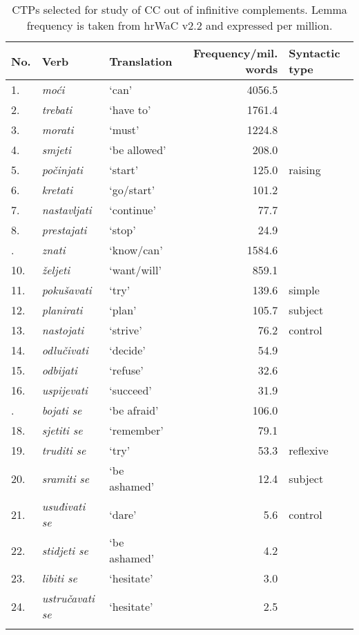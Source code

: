 \begin{table}[t]
\caption{CTPs selected for study of CC out of infinitive complements. Lemma frequency is taken from hrWaC v2.2 and expressed per million.\label{T12.3}}
\begin{tabular}{lllrl}
\lsptoprule
No. & Verb & Translation & Frequency/mil. words & Syntactic type\\\midrule
1.&\textit{moći} &‘can’&4056.5&\\
2.&\textit{trebati}&‘have to’&1761.4&\\
3. &\textit{morati}&‘must’ &1224.8&\\
4. &\textit{smjeti}&‘be allowed’ &208.0&\\
5. &\textit{počinjati}&‘start’ &125.0 &raising\\
6.&\textit{kretati}&‘go/start’ &101.2 &\\
7. &\textit{nastavljati}&‘continue’ &77.7 &\\
8. &\textit{prestajati}&‘stop’ &24.9  &\\
\tablevspace
9. &\textit{znati}&‘know/can’ &1584.6&\\
10. &\textit{željeti}&‘want/will’&859.1&\\
11. &\textit{pokušavati}&‘try’ &139.6&simple\\
12. &\textit{planirati}&‘plan’ &105.7 &subject\\
13. &\textit{nastojati}&‘strive’ &76.2 &control\\
14. &\textit{odlučivati}&‘decide’ &54.9  &\\
15. &\textit{odbijati}&‘refuse’ &32.6  &\\
16. &\textit{uspijevati}&‘succeed’ &31.9  &\\
\tablevspace
17. &\textit{bojati se}&‘be afraid’ &106.0 &\\
18. &\textit{sjetiti se}&‘remember’ &79.1  &\\
19. &\textit{truditi se}&‘try’ &53.3  &reflexive\\
20. &\textit{sramiti se}&‘be ashamed’ &12.4  &subject\\
21. &\textit{usuđivati se}&‘dare’ &5.6 &control\\
22. &\textit{stidjeti se}&‘be ashamed’ &4.2  &\\
23. &\textit{libiti se}&‘hesitate’ &3.0  &\\
24. &\textit{ustručavati se}&‘hesitate’ &2.5 &\\
\lspbottomrule
\end{tabular}
\end{table}



